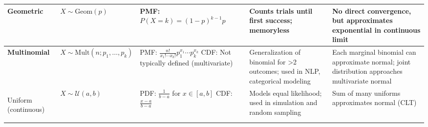 \documentclass[10pt]{article}
\begin{document}
\begin{longtable}{|>{\bfseries}m{2cm}|m{2.8cm}|p{4.5cm}|p{5.2cm}|p{4.5cm}|}
  Geometric & $X \sim \mathrm{Geom}(p)$ &
  PMF: $P(X = k) = (1 - p)^{k - 1} p$ &
  Counts trials until first success; memoryless &
  No direct convergence, but approximates exponential in continuous limit \\
  \hline

		Multinomial & $X \sim \mathrm{Mult}(n; p_1, \dots, p_k)$ &
  PMF: $\frac{n!}{x_1! \cdots x_k!} p_1^{x_1} \cdots p_k^{x_k}$ \newline
  CDF: Not typically defined (multivariate) &
  Generalization of binomial for >2 outcomes; used in NLP, categorical modeling &
		Each marginal binomial can approximate normal; joint distribution approaches
		multivariate normal \\
  \hline

  Uniform (continuous) & $X \sim \mathcal{U}(a, b)$ &
  PDF: $\frac{1}{b - a}$ for $x \in [a, b]$ \newline
  CDF: $\frac{x - a}{b - a}$ &
  Models equal likelihood; used in simulation and random sampling &
  Sum of many uniforms approximates normal (CLT) \\
  \hline

\end{longtable}
\end{document}
